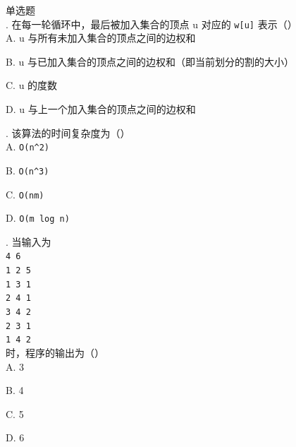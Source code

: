\documentclass[a4paper]{ctexart}
\newcommand{\wdot}{{\wingdingsfont\fontsize{12}{12}\selectfont\XeTeXglyph122\relax}}
\newcommand{\q}[1]{\noindent #1}
\newcommand{\opt}[1]{\hspace*{2em} #1\par}
\begin{document}
\noindent\wdot\hspace{0.5em}单选题\\
\q{24.} 在每一轮循环中，最后被加入集合的顶点 u 对应的 \texttt{w[u]} 表示（\qquad）\\
\opt{A. u 与所有未加入集合的顶点之间的边权和}
\opt{B. u 与已加入集合的顶点之间的边权和（即当前划分的割的大小）}
\opt{C. u 的度数}
\opt{D. u 与上一个加入集合的顶点之间的边权和}
\q{25.} 该算法的时间复杂度为（\qquad）\\
\opt{A. \texttt{O(n\^{}2)}}
\opt{B. \texttt{O(n\^{}3)}}
\opt{C. \texttt{O(nm)}}
\opt{D. \texttt{O(m log n)}}
\q{26.} 当输入为\\
\hspace*{2em} \texttt{4 6}\\
\hspace*{2em} \texttt{1 2 5}\\
\hspace*{2em} \texttt{1 3 1}\\
\hspace*{2em} \texttt{2 4 1}\\
\hspace*{2em} \texttt{3 4 2}\\
\hspace*{2em} \texttt{2 3 1}\\
\hspace*{2em} \texttt{1 4 2}\\
\hspace*{1em} 时，程序的输出为（\qquad）\\
\opt{A. 3}
\opt{B. 4}
\opt{C. 5}
\opt{D. 6}
\end{document}
